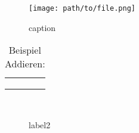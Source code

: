 
\begin{figure}[h]
    \begin{center}
        \texttt{[image: path/to/file.png]}
        \caption{caption}
        \label{fig:A1_label}
    \end{center}
\end{figure}



\begin{table}[ht]
    \centering
    \begin{tabular}{|c|c|c|c|}\hline
    \tbf{}     & \tbf{} & \tbf{} \\ \hline
                       &    &            \\
                 &   &         \\ \hline
                     &  &  \\ \hline
    \end{tabular}
    \caption{Beispiel Addieren:}
\end{table}


\iffalse
\fi

\begin{figure}[h]
\begin{center}
 \\
\caption{label2}
\label{some example}
\end{center}
\end{figure}
